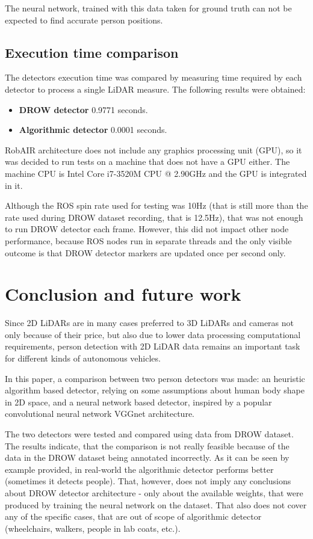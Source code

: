 \documentclass{article}
\begin{document}
The neural network, trained with this data taken for ground truth can not be expected to find accurate person positions.

\subsection{Execution time comparison}

The detectors execution time was compared by measuring time required by each detector to process a single LiDAR measure.
The following results were obtained:

\begin{itemize}
	\item \textbf{DROW detector} 0.9771 seconds.
	\item \textbf{Algorithmic detector} 0.0001 seconds.
\end{itemize}

RobAIR architecture does not include any graphics processing unit (GPU), so it was decided to run tests on a machine that does not have a GPU either.
The machine CPU is Intel\textregistered{} Core\texttrademark{} i7-3520M CPU @ 2.90GHz and the GPU is integrated in it.

Although the ROS spin rate used for testing was 10Hz (that is still more than the rate used during DROW dataset recording, that is 12.5Hz), that was not enough to run DROW detector each frame.
However, this did not impact other node performance, because ROS nodes run in separate threads and the only visible outcome is that DROW detector markers are updated once per second only.

\section{Conclusion and future work}

Since 2D LiDARs are in many cases preferred to 3D LiDARs and cameras not only because of their price, but also due to lower data processing computational requirements\cite{2D_3D_lidars}, person detection with 2D LiDAR data remains an important task for different kinds of autonomous vehicles.

In this paper, a comparison between two person detectors was made: an heuristic algorithm based detector, relying on some assumptions about human body shape in 2D space, and a neural network based detector, inspired by a popular convolutional neural network VGGnet\cite{vggnet_paper} architecture. 

The two detectors were tested and compared using data from DROW dataset.
The results indicate, that the comparison is not really feasible because of the data in the DROW dataset being annotated incorrectly.
As it can be seen by example provided, in real-world the algorithmic detector performs better (sometimes it detects people).
That, however, does not imply any conclusions about DROW detector architecture - only about the available weights, that were produced by training the neural network on the dataset.
That also does not cover any of the specific cases, that are out of scope of algorithmic detector (wheelchairs, walkers, people in lab coats, etc.).
\end{document}
